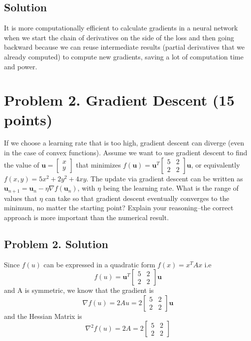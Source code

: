 \documentclass[a4paper,12pt]{article}
\begin{document}
\subsection{Solution}

It is more computationally efficient to calculate gradients in a neural network when
we start the chain of derivatives on the side of the loss and then going backward because we can reuse intermediate results (partial derivatives that we already computed) to compute new gradients, saving a lot of computation time and power.

\section*{Problem 2. Gradient Descent (15 points)}
If we choose a learning rate that is too high, gradient descent can diverge (even in the case of convex functions).
Assume we want to use gradient descent to find the value of $\mathbf{u} = \begin{bmatrix}
    x \\ y
\end{bmatrix}$ that minimizes $f(\mathbf{u}) = \mathbf{u}^T \begin{bmatrix}
    5 & 2 \\
    2 & 2
\end{bmatrix} \mathbf{u}$, or equivalently $f(x, y) = 5 x^2 + 2 y^2 + 4 x y$. The update via gradient descent can be written as $\mathbf{u}_{n+1} = \mathbf{u}_n - \eta \nabla f(\mathbf{u}_n)$, with $\eta$ being the learning rate. 
What is the range of values that $\eta$ can take so that gradient descent eventually converges to the minimum, no matter the starting point? Explain your reasoning–the correct approach is more important than the numerical result.  

\subsection*{Problem 2. Solution}

Since $ f(u) $ can be expressed in a quadratic form $ f(x) = x^T A x $ i.e \\
$$
f(u) = \mathbf{u}^T \begin{bmatrix}
    5 & 2 \\
    2 & 2
\end{bmatrix}
\mathbf{u}
$$
and A is symmetric, we know that the gradient is 
$$
\nabla f(u) = 2Au = 2 \begin{bmatrix}
    5 & 2 \\
    2 & 2
\end{bmatrix}
\mathbf{u}
$$
and the Hessian Matrix is
$$
\nabla^2 f(u) = 2A = 2 \begin{bmatrix}
    5 & 2 \\
    2 & 2
\end{bmatrix}
$$
\end{document}
